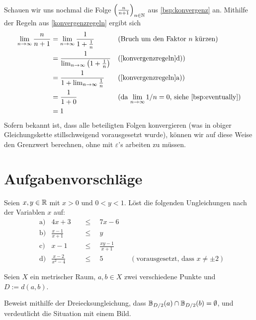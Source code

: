 \begin{bsp}
    Schauen wir uns nochmal die Folge $\left(\frac{n}{n+1}\right)_{n\in \mathbb N}$ aus \cref{bsp:konvergenz} an. Mithilfe der Regeln aus \cref{konvergenzregeln} ergibt sich
    \begin{align*}
        \lim_{n\to\infty} \frac{n}{n+1} & = \lim_{n\to\infty} \frac{1}{1+\frac{1}{n}} && (\text{Bruch um den Faktor $n$ kürzen}) \\
        & = \frac{1}{\lim_{n\to\infty} \left(1+\frac{1}{n}\right)} && (\text{\cref{konvergenzregeln}d)}) \\
        & = \frac{1}{1+\lim_{n\to\infty} \frac{1}{n}} && (\text{\cref{konvergenzregeln}a)}) \\
        & = \frac{1}{1+0} && (\text{da $\lim_{n\to\infty} 1/n=0$, siehe \cref{bsp:eventually}}) \\
        & = 1
    \end{align*}
    Sofern bekannt ist, dass alle beteiligten Folgen konvergieren (was in obiger Gleichungskette stillschweigend vorausgesetzt wurde), können wir auf diese Weise den Grenzwert berechnen, ohne mit $\varepsilon$'s arbeiten zu müssen.
\end{bsp}





\clearpage
\section{Aufgabenvorschläge}


\begin{aufg}
    Seien $x,y\in \mathbb R$ mit $x>0$ und $0<y<1$. Löst die folgenden Ungleichungen nach der Variablen $x$ auf:
    \begin{align*}
        &\text{a)} & 4x + 3 \quad&\le\quad 7x-6 \\[0.5em]
        &\text{b)} & \frac{x-1}{x+1} \quad&\le\quad y \\[0.5em]
        &\text{c)} & x-1 \quad&\le\quad \frac{xy-1}{x+1} \\[0.5em]
        &\text{d)} & \frac{x-2}{x^2-4} \quad&\le\quad 5 && (\text{vorausgesetzt, dass $x\neq \pm 2$})
    \end{align*}
\end{aufg}


\begin{aufg}
    Seien $X$ ein metrischer Raum, $a,b\in X$ zwei verschiedene Punkte und $D:=d(a,b)$.
    
    Beweist mithilfe der Dreiecksungleichung, dass $\mathbb B_{D/2}(a)\cap \mathbb B_{D/2}(b)=\emptyset$, und verdeutlicht die Situation mit einem Bild.
\end{aufg}


